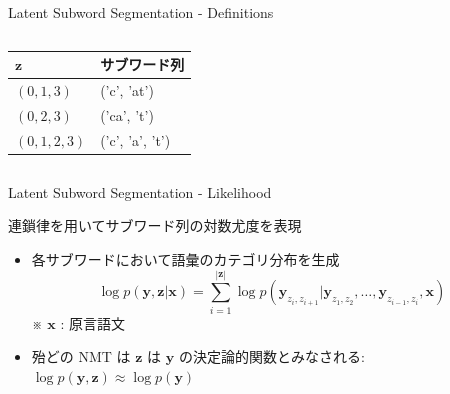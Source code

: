 \documentclass[unicode, 12pt, aspectratio=43]{beamer}
\begin{document}
\begin{frame}[label={sec:orgcfeb290}]{Latent Subword Segmentation - Definitions}
\begin{columns}
\begin{column}{0.5\columnwidth}
\footnotesize

\begin{center}
\begin{tabular}{ll}
\toprule
\(\boldsymbol{z}\) & サブワード列\\
\midrule
\((0,1,3)\) & ('c', 'at')\\
\((0,2,3)\) & ('ca', 't')\\
\((0,1,2,3)\) & ('c', 'a', 't')\\
\bottomrule
\end{tabular}
\end{center}
\end{column}
\end{columns}
\end{frame}

\begin{frame}[label={sec:orged48bc1}]{Latent Subword Segmentation - Likelihood}
\begin{block}{連鎖律を用いてサブワード列の対数尤度を表現}
\begin{itemize}
\item 各サブワードにおいて語彙のカテゴリ分布を生成
\begin{equation*}
  \log p(\boldsymbol{y},\boldsymbol{z} | \boldsymbol{x}) = \sum_{i=1}^{|\boldsymbol{z}|} \log p(\boldsymbol{y}_{z_i, z_{i+1}} | \boldsymbol{y}_{z_1, z_2},\ldots,\boldsymbol{y}_{z_{i-1}, z_i}, \boldsymbol{x})
\end{equation*}
※ \(\boldsymbol{x}\) : 原言語文
\item 殆どの NMT は \(\boldsymbol{z}\) は \(\boldsymbol{y}\) の決定論的関数とみなされる: \(\log p(\boldsymbol{y}, \boldsymbol{z}) \approx \log p(\boldsymbol{y})\)
\end{itemize}
\end{block}
\end{frame}
\end{document}
